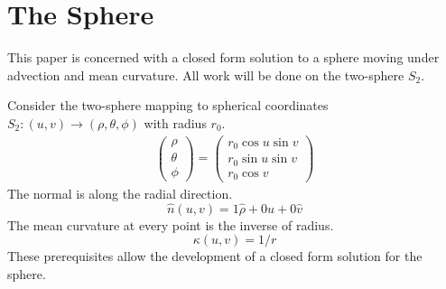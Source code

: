 \documentclass[journal]{IEEEtran}
\begin{document}
\section{The Sphere}
This paper is concerned with a closed form solution to a sphere moving under advection and mean curvature.
All work will be done on the two-sphere $S_2$.

Consider the two-sphere mapping to spherical coordinates $S_2 \colon (u,v) \rightarrow (\rho, \theta, \phi)$ with radius $r_0$.
\begin{align}
  \label{eqn:sphere:mapping}
  \begin{pmatrix}
    \rho \\
    \theta \\
    \phi
  \end{pmatrix} = 
  \begin{pmatrix}
    r_0 \cos u \sin v \\
    r_0 \sin u \sin v \\
    r_0 \cos v
  \end{pmatrix}
\end{align}
The normal is along the radial direction.
\begin{equation}
  \label{eqn:sphere:normal}
  \hat{n}(u,v) = 1\hat{\rho} + 0 \hat{u} + 0 \hat{v}
\end{equation}
The mean curvature at every point is the inverse of radius.
\begin{equation}
  \kappa(u,v) = 1/r
\end{equation}
These prerequisites allow the development of a closed form solution for the sphere.
\end{document}
